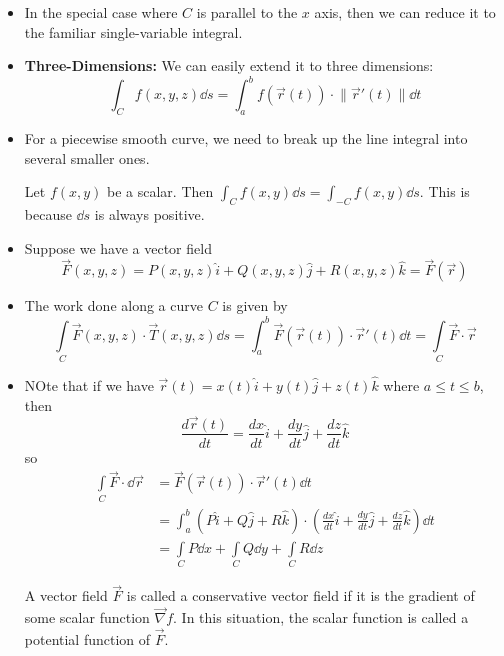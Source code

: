 \begin{itemize}
\begin{example}
    \end{example}
    \item In the special case where $C$ is parallel to the $x$ axis, then we can reduce it to the familiar single-variable integral.
    \item \textbf{Three-Dimensions:} We can easily extend it to three dimensions: 
    \begin{equation}
        \int_C f(x,y,z) \dd{s} = \int_a^b f(\vec{r}(t)) \cdot \lVert \vec{r}'(t)\rVert \dd{t} 
    \end{equation}
    \item For a piecewise smooth curve, we need to break up the line integral into several smaller ones.
    \begin{idea}
        Let $f(x,y)$ be a scalar. Then $\int_C f(x,y) \dd{s} = \int_{-C}f(x,y) \dd{s}$. This is because $\dd{s}$ is always positive.
    \end{idea}
    \item Suppose we have a vector field 
    \begin{equation}
        \vec{F}(x,y,z) = P(x,y,z)\hat{i} + Q(x,y,z)\hat{j} + R(x,y,z)\hat{k} = \vec{F}(\vec{r})
    \end{equation}
    \item The work done along a curve $C$ is given by 
    \begin{equation}
        \int\limits_C \vec{F}(x,y,z)\cdot \vec{T}(x,y,z)\dd{s} = \int_a^b \vec{F}(\vec{r}(t)) \cdot \vec{r}'(t) \dd{t} = \int\limits_C \vec{F}\cdot \vec{r}
    \end{equation}
    \item NOte that if we have $\vec{r}(t)=x(t)\hat{i}+y(t)\hat{j} + z(t)\hat{k}$ where $a\le t\le b$, then 
    \begin{equation}
        \frac{d\vec{r}(t)}{dt} = \frac{dx}{dt}\hat{i} + \frac{dy}{dt}\hat{j} + \frac{dz}{dt} \hat{k}
    \end{equation}
    so 
    \begin{align}
        \int\limits_C \vec{F}\cdot \dd{\vec{r}} &= \vec{F}(\vec{r}(t))\cdot \vec{r}'(t) \dd{t} \\ 
        &= \int_a^b (P\hat{i}+Q\hat{j}+R\hat{k})\cdot \left(\frac{dx}{dt}\hat{i} + \frac{dy}{dt}\hat{j} + \frac{dz}{dt}\hat{k}\right)\dd{t} \\ 
        &= \int\limits_C P \dd{x} + \int\limits_C Q \dd{y} + \int\limits_C R \dd{z}
    \end{align}
    \begin{definition}
        A vector field $\vec{F}$ is called a conservative vector field if it is the gradient of some scalar function $\vec{\nabla} f.$ In this situation, the scalar function is called a potential function of $\vec{F}$.

\end{definition}
\end{itemize}
